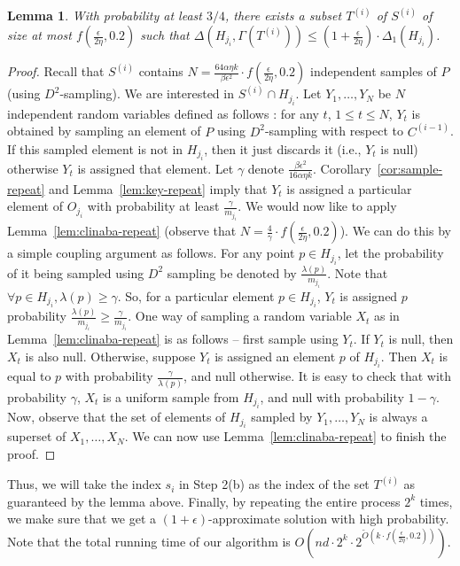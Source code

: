 \documentclass[11pt]{article}
\newtheorem{lemma}{Lemma}
\newcommand{\eps}{{\epsilon}}
\newcommand{\C}[1]{{{C}^{(#1)}}}
\newcommand{\itS}[1]{{{S}^{(#1)}}}
\newcommand{\itT}[1]{{{T}^{(#1)}}}
\begin{document}
\begin{lemma}
\label{lem:final-repeat}
With probability at least $3/4$, there exists a subset $\itT{i}$ of $\itS{i}$ of size at most $f \left(\frac{\eps}{2 \eta}, 0.2 \right)$ such that
$ \Delta(H_{j_i}, \Gamma(\itT{i})) \leq \left(1 + \frac{\eps}{2 \eta}\right) \cdot \Delta_1(H_{j_i})$.
\end{lemma}
\begin{proof}
Recall that $\itS{i}$ contains $N = \frac{64 \alpha \eta k}{\beta \eps^2} \cdot f \left(\frac{\eps}{2 \eta}, 0.2 \right)$ independent samples of $P$ (using $D^2$-sampling). 
We are interested in $\itS{i} \cap H_{j_i}$.
Let $Y_1, \ldots, Y_N$ be  $N$ independent random variables defined as follows : 
for any $t$, $1 \leq t \leq N$, $Y_t$ is obtained by sampling an element of $P$ using $D^2$-sampling with respect to $\C{i-1}$. 
If this sampled element is not in $H_{j_i}$, then it just discards it (i.e., $Y_t$ is null) otherwise $Y_t$ is assigned that element.
Let $\gamma$ denote $\frac{\beta \eps^2}{16 \alpha \eta k}$. 
Corollary~\ref{cor:sample-repeat} and Lemma~\ref{lem:key-repeat} imply that $Y_t$ is assigned a particular element of $O_{j_i}$ with probability at least $\frac{\gamma}{m_{j_i}}$. 
We would now like to apply Lemma~\ref{lem:clinaba-repeat} (observe that $N = \frac{4}{\gamma} \cdot f \left(\frac{\eps}{2 \eta}, 0.2 \right)$). 
We can do this by a simple coupling argument as follows.
For any point $p \in H_{j_i}$, let the probability of it being sampled using $D^2$ sampling be denoted by $\frac{\lambda(p)}{m_{j_i}}$.
Note that $\forall p \in H_{j_i}, \lambda(p) \geq \gamma$.
So, for a particular element $p \in H_{j_i}$, $Y_t$ is assigned $p$ probability $\frac{\lambda(p)}{m_{j_i}} \geq \frac{\gamma}{m_{j_i}}$.
One way of sampling a random variable $X_t$ as in Lemma~\ref{lem:clinaba-repeat} is as follows --  first sample using $Y_t$. 
If $Y_t$ is null, then $X_t$ is also null. 
Otherwise, suppose $Y_t$ is assigned an element $p$ of $H_{j_i}$. 
Then $X_t$ is equal to $p$ with probability $\frac{\gamma}{\lambda(p)}$, and null otherwise. 
It is easy to check that with probability $\gamma$, $X_t$ is a uniform sample from $H_{j_i}$, and null with probability $1-\gamma$. 
Now, observe that the set of elements of $H_{j_i}$ sampled by $Y_1, \ldots, Y_N$ is always a superset of $X_1, \ldots, X_N$. 
We can now use Lemma~\ref{lem:clinaba-repeat} to finish the proof.
\end{proof}

Thus, we will take the index $s_i$ in Step 2(b) as the index of the set $\itT{i}$ as guaranteed by the lemma above.
Finally, by repeating the entire process $2^k$ times, we make sure that we get a $(1+\eps)$-approximate solution
with high probability.
Note that the total running time of our algorithm is $O\left( nd \cdot 2^k \cdot 2^{\tilde{O}\left(k \cdot f \left(\frac{\eps}{2 \eta}, 0.2 \right)\right)} \right)$.
\end{document}
